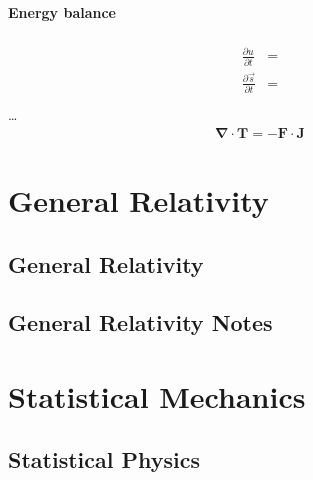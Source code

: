\documentclass[letterpaper,10pt,english]{jupyterBook}
\begin{document}
\subsection{Energy balance}
\label{\detokenize{ch/relativity-special/notes:energy-balance}}\begin{equation*}
\begin{split}\begin{aligned}
  \frac{\partial u      }{\partial t} & = \\
  \frac{\partial \vec{s}}{\partial t} & = \\
\end{aligned}\end{split}
\end{equation*}
\sphinxAtStartPar
…
\begin{equation*}
\begin{split}\symbf{\nabla} \cdot \mathbf{T} = - \mathbf{F} \cdot \mathbf{J}\end{split}
\end{equation*}
\sphinxstepscope


\part{General Relativity}

\sphinxstepscope


\chapter{General Relativity}
\label{\detokenize{ch/relativity-general/intro:general-relativity}}\label{\detokenize{ch/relativity-general/intro:relativity-general-intro}}\label{\detokenize{ch/relativity-general/intro::doc}}
\sphinxstepscope


\chapter{General Relativity \sphinxhyphen{} Notes}
\label{\detokenize{ch/relativity-general/notes:general-relativity-notes}}\label{\detokenize{ch/relativity-general/notes:relativity-general-notes}}\label{\detokenize{ch/relativity-general/notes::doc}}
\sphinxstepscope


\part{Statistical Mechanics}

\sphinxstepscope


\chapter{Statistical Physics}
\label{\detokenize{ch/statistical-mechanics/intro:statistical-physics}}\label{\detokenize{ch/statistical-mechanics/intro:statistical-mechanics-intro}}\label{\detokenize{ch/statistical-mechanics/intro::doc}}
\sphinxstepscope
\end{document}
